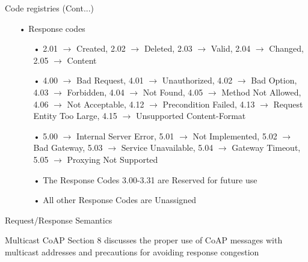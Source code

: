 \documentclass[11pt]{beamer}
\begin{document}
\begin{frame}{Code registries (Cont...)}
\begin{itemize}
\item[•] Response codes
\begin{itemize}
\item[•] 2.01 $\rightarrow$ Created, 2.02 $\rightarrow$ Deleted, 2.03 $\rightarrow$ Valid, 2.04 $\rightarrow$ Changed, 2.05 $\rightarrow$ Content
\item[•] 4.00 $\rightarrow$ Bad Request, 4.01 $\rightarrow$ Unauthorized, 4.02 $\rightarrow$ Bad Option, 4.03 $\rightarrow$ Forbidden, 4.04 $\rightarrow$ Not Found, 4.05 $\rightarrow$ Method Not Allowed, 4.06 $\rightarrow$ Not Acceptable, 4.12 $\rightarrow$ Precondition Failed, 4.13 $\rightarrow$ Request Entity Too Large, 4.15 $\rightarrow$ Unsupported Content-Format
\item[•] 5.00 $\rightarrow$ Internal Server Error, 5.01 $\rightarrow$ Not Implemented, 5.02 $\rightarrow$ Bad Gateway, 5.03 $\rightarrow$ Service Unavailable, 5.04 $\rightarrow$ Gateway Timeout, 5.05 $\rightarrow$ Proxying Not Supported
\item[•] The Response Codes 3.00-3.31 are Reserved for future use
\item[•] All other Response Codes are Unassigned
\end{itemize}
\end{itemize}
\end{frame}
\begin{frame}{Request/Response Semantics}

\end{frame}
\begin{frame}{Multicast CoAP}
Section 8 discusses the proper use of CoAP messages with multicast addresses and precautions for avoiding response congestion
\end{frame}
\end{document}
